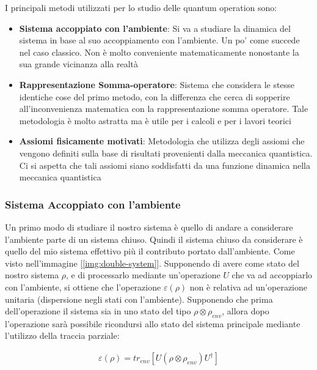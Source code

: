 I principali metodi utilizzati per lo studio delle quantum operation sono:
\begin{itemize}
    \item \textbf{Sistema accoppiato con l'ambiente}: Si va a studiare la dinamica del sistema in base al suo accoppiamento con l'ambiente. Un po' come succede nel caso classico. Non è molto conveniente matematicamente nonostante la sua grande vicinanza alla realtà
    
    \item \textbf{Rappresentazione Somma-operatore}: Sistema che considera le stesse identiche cose del primo metodo, con la differenza che cerca di sopperire all'inconvenienza matematica con la rappresentazione somma operatore. Tale metodologia è molto astratta ma è utile per i calcoli e per i lavori teorici

    \item \textbf{Assiomi fisicamente motivati}: Metodologia che utilizza degli assiomi che vengono definiti sulla base di risultati provenienti dalla meccanica quantistica. Ci si aspetta che tali assiomi siano soddisfatti da una funzione dinamica nella meccanica quantistica
\end{itemize}

\subsubsection{Sistema Accoppiato con l'ambiente}
Un primo modo di studiare il nostro sistema è quello di andare a considerare l'ambiente parte di un sistema chiuso. Quindi il sistema chiuso da considerare è quello del mio sistema effettivo più il contributo portato dall'ambiente. Come visto nell'immagine [\ref{img:double-system}]. Supponendo di avere come stato del nostro sistema \(\rho\), e di processarlo mediante un'operazione \(U\) che va ad accoppiarlo con l'ambiente, si ottiene che l'operazione \(\varepsilon(\rho)\) non è relativa ad un'operazione unitaria (dispersione negli stati con l'ambiente). Supponendo che prima dell'operazione il sistema sia in uno stato del tipo \(\rho \otimes \rho_{env}\), allora dopo l'operazione sarà possibile ricondursi allo stato del sistema principale mediante l'utilizzo della traccia parziale:

\begin{gather*}
    \varepsilon(\rho) = tr_{env}\left[U (\rho \otimes \rho_{env})U^\dagger\right]
\end{gather*}

